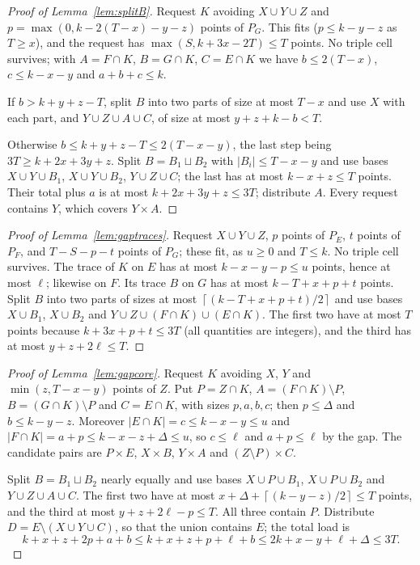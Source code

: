 \documentclass[11pt]{article}
\numberwithin{equation}{section}
\theoremstyle{definition}
\theoremstyle{remark}
\newcommand{\ceil}[1]{\left\lceil #1\right\rceil}
\begin{document}
\begin{proof}[Proof of Lemma~\ref{lem:splitB}]
Request $K$ avoiding $X\cup Y\cup Z$ and $p=\max(0,k-2(T-x)-y-z)$ points of
$P_G$. This fits ($p\le k-y-z$ as $T\ge x$), and the request has
$\max(S,k+3x-2T)\le T$ points. No triple cell survives; with
$A=F\cap K$, $B=G\cap K$, $C=E\cap K$ we have $b\le2(T-x)$,
$c\le k-x-y$ and $a+b+c\le k$.

If $b>k+y+z-T$, split $B$ into two parts of size at most $T-x$ and use
$X$ with each part, and $Y\cup Z\cup A\cup C$, of size at most
$y+z+k-b<T$.

Otherwise $b\le k+y+z-T\le2(T-x-y)$, the last step being
$3T\ge k+2x+3y+z$. Split $B=B_1\sqcup B_2$ with $|B_i|\le T-x-y$ and use
bases $X\cup Y\cup B_1$, $X\cup Y\cup B_2$, $Y\cup Z\cup C$; the last has
at most $k-x+z\le T$ points. Their total plus $a$ is at most
$k+2x+3y+z\le3T$; distribute $A$. Every request contains $Y$, which
covers $Y\times A$.
\end{proof}

\begin{proof}[Proof of Lemma~\ref{lem:gaptraces}]
Request $X\cup Y\cup Z$, $p$ points of $P_E$, $t$ points of $P_F$, and
$T-S-p-t$ points of $P_G$; these fit, as $u\ge0$ and $T\le k$. No
triple cell survives. The trace of $K$ on $E$ has at most
$k-x-y-p\le u$ points, hence at most $\ell$; likewise on $F$. Its trace
$B$ on $G$ has at most $k-T+x+p+t$ points. Split $B$ into two parts of
sizes at most $\ceil{(k-T+x+p+t)/2}$ and use bases $X\cup B_1$,
$X\cup B_2$ and $Y\cup Z\cup(F\cap K)\cup(E\cap K)$. The first two have
at most $T$ points because $k+3x+p+t\le3T$ (all quantities are
integers), and the third has at most $y+z+2\ell\le T$.
\end{proof}

\begin{proof}[Proof of Lemma~\ref{lem:gapcore}]
Request $K$ avoiding $X$, $Y$ and $\min(z,T-x-y)$ points of $Z$. Put
$P=Z\cap K$, $A=(F\cap K)\setminus P$, $B=(G\cap K)\setminus P$ and
$C=E\cap K$, with sizes $p,a,b,c$; then $p\le\Delta$ and $b\le k-y-z$.
Moreover $|E\cap K|=c\le k-x-y\le u$ and
$|F\cap K|=a+p\le k-x-z+\Delta\le u$, so $c\le\ell$ and $a+p\le\ell$ by the gap.
The candidate pairs are $P\times E$, $X\times B$, $Y\times A$ and
$(Z\setminus P)\times C$.

Split $B=B_1\sqcup B_2$ nearly equally and use bases $X\cup P\cup B_1$,
$X\cup P\cup B_2$ and $Y\cup Z\cup A\cup C$. The first two have at most
$x+\Delta+\ceil{(k-y-z)/2}\le T$ points, and the third at most
$y+z+2\ell-p\le T$. All three contain $P$. Distribute
$D=E\setminus(X\cup Y\cup C)$, so that the union contains $E$; the total
load is
\[
 k+x+z+2p+a+b\le k+x+z+p+\ell+b\le2k+x-y+\ell+\Delta\le3T .
\]
\end{proof}
\end{document}
